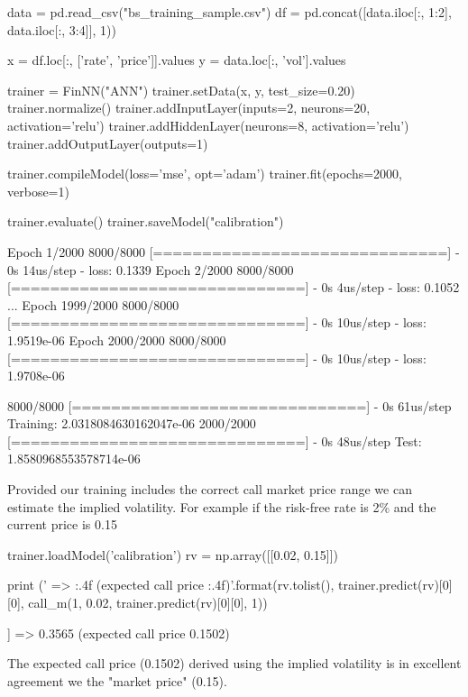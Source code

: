 \begin{ipython}
data = pd.read_csv("bs_training_sample.csv")
df = pd.concat([data.iloc[:, 1:2], data.iloc[:, 3:4]], 1))

x = df.loc[:, ['rate', 'price']].values
y = data.loc[:, 'vol'].values

trainer = FinNN("ANN")
trainer.setData(x, y, test_size=0.20)
trainer.normalize()
trainer.addInputLayer(inputs=2, neurons=20, activation='relu')
trainer.addHiddenLayer(neurons=8, activation='relu')
trainer.addOutputLayer(outputs=1)

trainer.compileModel(loss='mse', opt='adam')
trainer.fit(epochs=2000, verbose=1)

trainer.evaluate()
trainer.saveModel("calibration")
\end{ipython}
\begin{ioutput}
Epoch 1/2000
8000/8000 [==============================] - 0s 14us/step - loss: 0.1339
Epoch 2/2000
8000/8000 [==============================] - 0s 4us/step - loss: 0.1052
...
Epoch 1999/2000
8000/8000 [==============================] - 0s 10us/step - loss: 1.9519e-06
Epoch 2000/2000
8000/8000 [==============================] - 0s 10us/step - loss: 1.9708e-06

8000/8000 [==============================] - 0s 61us/step
Training: 2.0318084630162047e-06
2000/2000 [==============================] - 0s 48us/step
Test: 1.8580968553578714e-06
\end{ioutput}

Provided our training includes the correct call market price range we can estimate the implied volatility. For example if the risk-free rate is 2\% and the current price is 0.15 

\begin{ipython}
trainer.loadModel('calibration')
rv = np.array([[0.02, 0.15]])

print ('{} => {:.4f} (expected call price {:.4f})'.format(rv.tolist(),
                                                   trainer.predict(rv)[0][0],
                                                   call_m(1, 0.02, 
                                                   trainer.predict(rv)[0][0], 1))
\end{ipython}
\begin{ioutput}
[[0.02, 0.15]] => 0.3565 (expected call price 0.1502)
\end{ioutput}
\noindent
The expected call price (0.1502) derived using the implied volatility is in excellent agreement we the "market price" (0.15).

